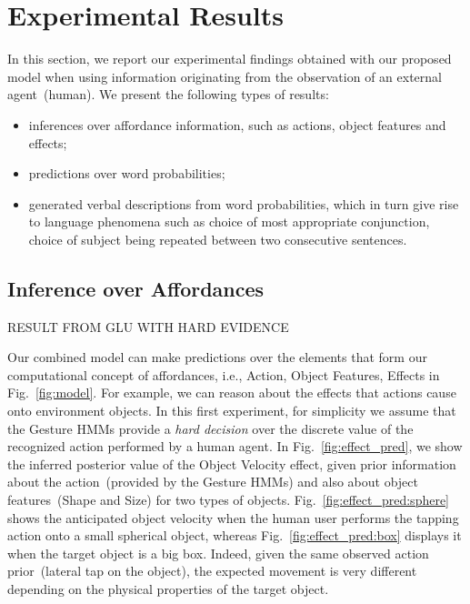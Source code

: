 
\section{Experimental Results}

In this section, we report our experimental findings obtained with our proposed model when using information originating from the observation of an external agent~(human).
We present the following types of results:
\begin{itemize}
  \item inferences over affordance information, such as actions, object features and effects;

  \item predictions over word probabilities;

  \item generated verbal descriptions from word probabilities, which in turn give rise to language phenomena such as choice of most appropriate conjunction, choice of subject being repeated between two consecutive sentences.
\end{itemize}

\subsection{Inference over Affordances}

RESULT FROM GLU WITH HARD EVIDENCE

Our combined model can make predictions over the elements that form our computational concept of affordances, i.e., Action, Object Features, Effects in Fig.~\ref{fig:model}.
For example, we can reason about the effects that actions cause onto environment objects.
In this first experiment, for simplicity we assume that the Gesture \acp{HMM} provide a \emph{hard decision} over the discrete value of the recognized action performed by a human agent.
In Fig.~\ref{fig:effect_pred}, we show the inferred posterior value of the Object Velocity effect, given prior information about the action~(provided by the Gesture \acp{HMM}) and also about object features~(Shape and Size) for two types of objects.
Fig.~\ref{fig:effect_pred:sphere} shows the anticipated object velocity when the human user performs the tapping action onto a small spherical object, whereas Fig.~\ref{fig:effect_pred:box} displays it when the target object is a big box. Indeed, given the same observed action prior~(lateral tap on the object), the expected movement is very different depending on the physical properties of the target object.

